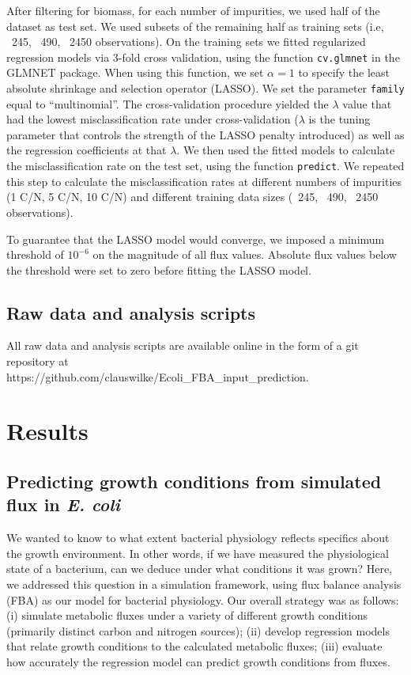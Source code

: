 \documentclass[12pt]{article}
\begin{document}
After filtering for biomass, for each number of impurities, we used half of the dataset as test set. We used subsets of the remaining half as training sets (i.e, ~245, ~490, ~2450 observations). On the training sets we fitted regularized regression models via 3-fold cross validation, using the function \texttt{cv.glmnet} in the GLMNET package. When using this function, we set $\alpha=1$ to specify the least absolute shrinkage and selection operator (LASSO). We set the parameter \texttt{family} equal to ``multinomial''. The cross-validation procedure yielded the  $\lambda$ value that had the lowest misclassification rate under cross-validation ($\lambda$ is the tuning parameter that controls the strength of the LASSO penalty introduced) as well as the regression coefficients at that $\lambda$. We then used the fitted models to calculate the misclassification rate on the test set, using the function \texttt{predict}. We repeated this step to calculate the misclassification rates at different numbers of impurities (1 C/N, 5 C/N, 10 C/N) and different training data sizes (~245, ~490, ~2450 observations).

To guarantee that the LASSO model would converge, we imposed a minimum threshold of $10^{-6}$ on the magnitude of all flux values. Absolute flux values below the threshold were set to zero before fitting the LASSO model.

\subsection{Raw data and analysis scripts}

All raw data and analysis scripts are available online in the form of a git repository at\\ https://github.com/clauswilke/Ecoli\_FBA\_input\_prediction.

\section{Results}

\subsection{Predicting growth conditions from simulated flux in \emph{E. coli}}

We wanted to know to what extent bacterial physiology reflects specifics about the growth environment. In other words, if we have measured the physiological state of a bacterium, can we deduce under what conditions it was grown? Here, we addressed this question in a simulation framework, using flux balance analysis (FBA) as our model for bacterial physiology. Our overall strategy was as follows: (i) simulate metabolic fluxes under a variety of different growth conditions (primarily distinct carbon and nitrogen sources); (ii) develop regression models that relate growth conditions to the calculated metabolic fluxes; (iii) evaluate how accurately the regression model can predict growth conditions from fluxes.
\end{document}
